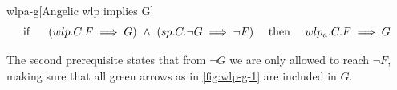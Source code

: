 \begin{lemma}{wlpa-g}[Angelic wlp implies G]
\ \\ \vspace{-3mm}
	\[\hspace{-2mm}
	\text{ if \ \ \ \ } 
	(wlp.C.F\implies G)
	\ \wedge\ 
	(sp.C.\neg G \implies \neg F) 
	\text{\ \ \ \  then\ \ \ \  } 
	wlp_a.C.F \implies G
	\] 
	\label{lem:wlp-g}
\end{lemma}
The second prerequisite  states that from $\neg G$ we are only allowed to reach $\neg F$, making sure that all green arrows as in \autoref{fig:wlp-g-1} are included in $G$. 

\newcommand{\lblth}[1]{\hypertarget{3.#1}{{\text{#1}}}}
\newcommand{\refth}[1]{\hyperlink{3.#1}{{\text{Line (#1)}}}}
